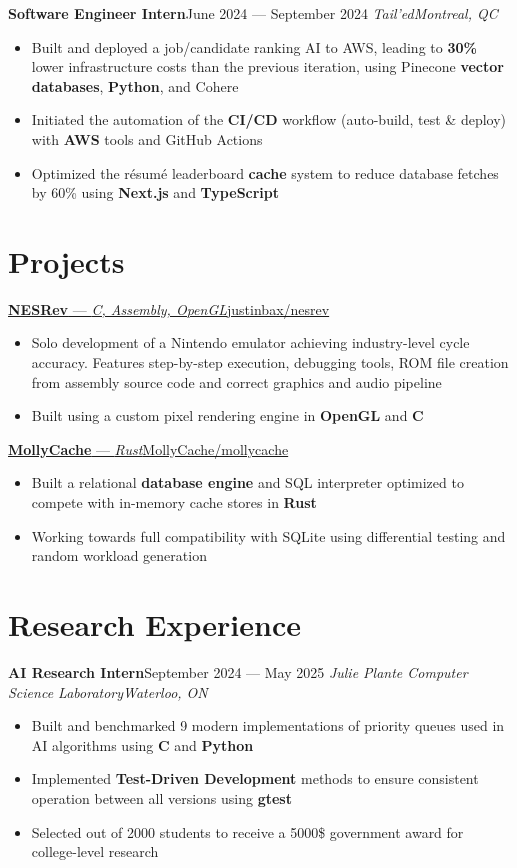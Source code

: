 \documentclass{article}
\newcommand{\newrole}[4]{
    {\normalfont\textbf{#1}\hfill#3}
    \newline
    \textit{#2}\hfill\textit{#4}
}
\newcommand{\shortlinkrole}[4]{
    {\href{#3}{\normalfont\textbf{#1} --- \textit{#2}\hfill#4\:\faExternalLink}\vspace*{-4pt}}
}
\newenvironment{bulletpoints}{\begin{itemize}\setlength\itemsep{-0.2em}}{\end{itemize}}
\begin{document}
\newrole{Software Engineer Intern}{Tail'ed}{June 2024 --- September 2024}{Montreal, QC}
\begin{bulletpoints}
    \item Built and deployed a job/candidate ranking AI to AWS, leading to \textbf{30\%} lower infrastructure costs than the previous iteration, using Pinecone \textbf{vector databases}, \textbf{Python}, and Cohere
    \item Initiated the automation of the \textbf{CI/CD} workflow (auto-build, test \& deploy) with \textbf{AWS} tools and GitHub Actions
    \item Optimized the résumé leaderboard \textbf{cache} system to reduce database fetches by 60\% using \textbf{Next.js} and \textbf{TypeScript}
\end{bulletpoints}


\section*{Projects}

\shortlinkrole{NESRev}{C, Assembly, OpenGL}{https://github.com/justinbax/nesrev}{justinbax/nesrev}
\begin{bulletpoints}
    \item Solo development of a Nintendo emulator achieving industry-level cycle accuracy. Features step-by-step execution, debugging tools, ROM file creation from assembly source code and correct graphics and audio pipeline
    \item Built using a custom pixel rendering engine in \textbf{OpenGL} and \textbf{C}
\end{bulletpoints}

\shortlinkrole{MollyCache}{Rust}{https://github.com/MollyCache/mollycache}{MollyCache/mollycache}
\begin{bulletpoints}
    \item Built a relational \textbf{database engine} and SQL interpreter optimized to compete with in-memory cache stores in \textbf{Rust}
    \item Working towards full compatibility with SQLite using differential testing and random workload generation
\end{bulletpoints}


\section*{Research Experience}
\newrole{AI Research Intern}{Julie Plante Computer Science Laboratory}{September 2024 --- May 2025}{Waterloo, ON}
\begin{bulletpoints}
    \item Built and benchmarked 9 modern implementations of priority queues used in AI algorithms using \textbf{C} and \textbf{Python}
    \item Implemented \textbf{Test-Driven Development} methods to ensure consistent operation between all versions using \textbf{gtest}
    \item Selected out of 2000 students to receive a 5000\$ government award for college-level research
\end{bulletpoints}
\end{document}
